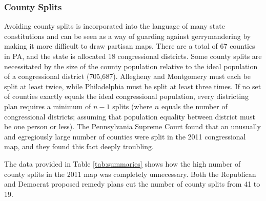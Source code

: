             \subsubsection*{County Splits}
    Avoiding county splits is incorporated into the language of many state constitutions \citep{Grofman1985} and can be seen as a way of guarding against gerrymandering by making it more difficult to draw partisan maps. There are a total of 67 counties in PA, and the state is allocated 18 congressional districts. Some county splits are necessitated by the size of the county population relative to the ideal population of a congressional district (705,687).  Allegheny and Montgomery must each be split at least twice, while Philadelphia must be split at least three times. If no set of counties exactly equals the ideal congressional population, every districting plan requires a minimum of $n-1$ splits (where $n$ equals the number of congressional districts; assuming that population equality between district must be one person or less). The Pennsylvania Supreme Court found that an unusually and egregiously large number of counties were split in the 2011 congressional map, and they found this fact deeply troubling.
\par
    The data provided in Table \ref{tab:summaries} shows how the high number of county splits in the 2011 map was completely unnecessary. Both the Republican and Democrat proposed remedy plans cut the number of county splits from 41 to 19.
